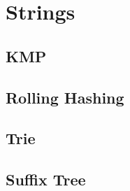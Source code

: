 \documentclass[../Notes/main.tex]{subfiles}
\begin{document}
\section{Strings}

\subsection{KMP}


\subsection{Rolling Hashing}


\subsection{Trie}


\subsection{Suffix Tree}

\end{document}
